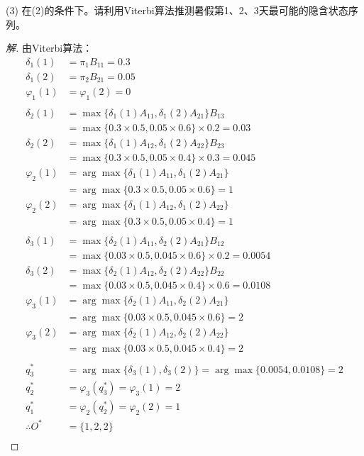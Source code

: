 \documentclass[a4paper]{article}
\begin{document}
(3) 在(2)的条件下。{\color{blue}请利用Viterbi算法推测暑假第1、2、3天最可能的隐含状态序列}。
\begin{proof}[解]
    由Viterbi算法：
    \begin{align*}
        \delta_1(1) & = \pi_1 B_{11} = 0.3 \\
        \delta_1(2) & = \pi_2 B_{21} = 0.05 \\
        \varphi_1(1) & = \varphi_1(2) = 0 \\
        \\
        \delta_2(1) & = \max\{\delta_1(1)A_{11}, \delta_1(2)A_{21}\}B_{13} \\
            & = \max\{0.3 \times 0.5, 0.05 \times 0.6\} \times 0.2 = 0.03 \\
        \delta_2(2) & = \max\{\delta_1(1)A_{12}, \delta_1(2)A_{22}\}B_{23} \\
            & = \max\{0.3 \times 0.5, 0.05 \times 0.4\} \times 0.3 = 0.045 \\
        \varphi_2(1) & = \arg \max\{\delta_1(1)A_{11}, \delta_1(2)A_{21}\} \\
            & = \arg \max\{0.3 \times 0.5, 0.05 \times 0.6\} = 1 \\
        \varphi_2(2) & = \arg \max\{\delta_1(1)A_{12}, \delta_1(2)A_{22}\} \\
            & = \arg \max\{0.3 \times 0.5, 0.05 \times 0.4\} = 1 \\
        \\
        \delta_3(1) & = \max\{\delta_2(1)A_{11}, \delta_2(2)A_{21}\}B_{12} \\
            & = \max\{0.03 \times 0.5, 0.045 \times 0.6\} \times 0.2 = 0.0054 \\
        \delta_3(2) & = \max\{\delta_2(1)A_{12}, \delta_2(2)A_{22}\}B_{22} \\
            & = \max\{0.03 \times 0.5, 0.045 \times 0.4\} \times 0.6 = 0.0108 \\
        \varphi_3(1) & = \arg \max\{\delta_2(1)A_{11}, \delta_2(2)A_{21}\} \\
            & = \arg \max\{0.03 \times 0.5, 0.045 \times 0.6\} = 2 \\
        \varphi_3(2) & = \arg \max\{\delta_2(1)A_{12}, \delta_2(2)A_{22}\} \\
            & = \arg \max\{0.03 \times 0.5, 0.045 \times 0.4\} = 2 \\
        \\
        q_3^* & = \arg \max\{\delta_3(1), \delta_3(2)\} = \arg\max\{0.0054, 0.0108\} = 2 \\
        q_2^* & = \varphi_3(q_3^*) = \varphi_3(1) = 2 \\
        q_1^* & = \varphi_2(q_2^*) = \varphi_2(2) = 1 \\
        \therefore O^* & = \{1, 2, 2\} \\
    \end{align*}
\end{proof}
\end{document}

